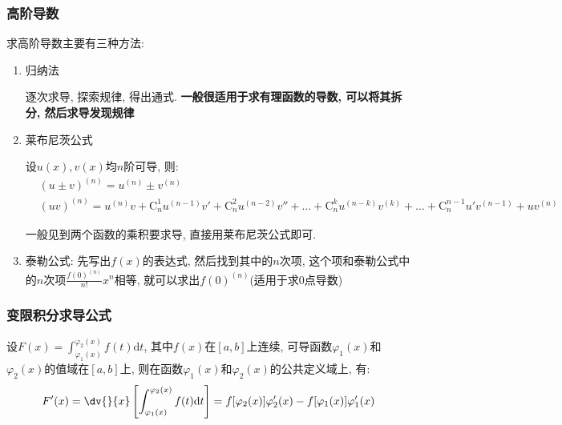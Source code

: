 \subsubsection{高阶导数}
求高阶导数主要有三种方法:
\begin{enumerate}
    \item 归纳法 \par 逐次求导, 探索规律, 得出通式. \textbf{一般很适用于求有理函数的导数, 可以将其拆分, 然后求导发现规律}
    \item 莱布尼茨公式 \par 设$ u(x),v(x) $均$ n $阶可导, 则:
          \begin{equation*}
              \begin{aligned}
                   & (u\pm v)^{(n)}=u^{(n)}\pm v^{(n)}                                                                                                                                        \\
                   & (uv)^{(n)}=u^{(n)}v+\mathrm{C}_{n}^{1}u^{(n-1)}v'+\mathrm{C}_{n}^{2}u^{(n-2)}v''+\dots+\mathrm{C}_{n}^{k}u^{(n-k)}v^{(k)}+\dots+\mathrm{C}_{n}^{n-1}u'v^{(n-1)}+uv^{(n)}
              \end{aligned}
          \end{equation*}\par
          一般见到两个函数的乘积要求导, 直接用莱布尼茨公式即可.
    \item 泰勒公式: 先写出$ f(x) $的表达式, 然后找到其中的$ n $次项, 这个项和泰勒公式中的$ n $次项$ \frac{f(0)^{(n)}}{n!}x^{n} $相等, 就可以求出$ f(0)^{(n)} $(适用于求$ 0 $点导数)
\end{enumerate}
\subsubsection{变限积分求导公式}
设$ F(x)=\int_{\varphi_{1}(x)}^{\varphi_{2}(x)}f(t)\mathrm{d}t $, 其中$ f(x) $在$ [a,b] $上连续, 可导函数$ \varphi_{1}(x) $和$ \varphi_{2}(x) $的值域在$ [a,b] $上, 则在函数$ \varphi_{1}(x) $和$ \varphi_{2}(x) $的公共定义域上, 有:
\begin{equation*}
    F'(x)=\dv{}{x}\left[\int_{\varphi_{1}(x)}^{\varphi_{2}(x)}f(t)\mathrm{d}t\right]=f[\varphi_{2}(x)]\varphi'_{2}(x)-f[\varphi_{1}(x)]\varphi'_{1}(x)
\end{equation*}
